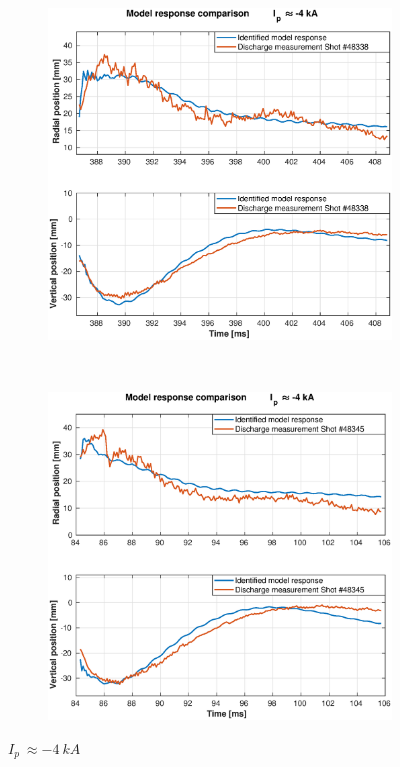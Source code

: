 \begin{figure}
	\begin{subfigure}[b]{0.55\textwidth}
		\includegraphics[width=\textwidth]{Chp5/SimResp_338.eps}  
		\caption{\label{SimResp338} }
	\end{subfigure}
	~ %
	\begin{subfigure}[b]{0.55\textwidth}
		\includegraphics[width=\textwidth]{Chp5/SimResp_345.eps}        
		\caption{\label{SimResp345}}
	\end{subfigure}
	\caption{$I_p~\approx -4~kA$  \label{SimResp_neg}}
\end{figure}





